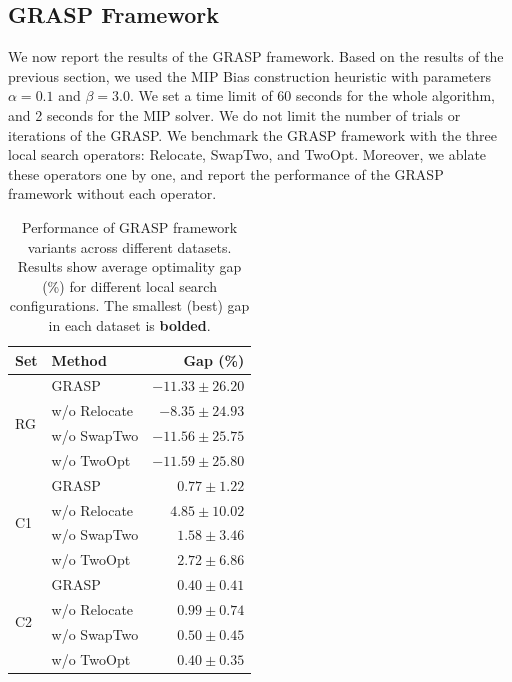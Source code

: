 \documentclass[twocolumn, switch]{article} %
\begin{document}
\subsection{GRASP Framework}

We now report the results of the GRASP framework. 
Based on the results of the previous section, we used the MIP Bias construction heuristic with parameters $\alpha = 0.1$ and $\beta = 3.0$.
We set a time limit of 60 seconds for the whole algorithm, and 2 seconds for the MIP solver.
We do not limit the number of trials or iterations of the GRASP. We benchmark the GRASP framework with the three local search operators: Relocate, SwapTwo, and TwoOpt.
Moreover, we ablate these operators one by one, and report the performance of the GRASP framework without each operator.


\begin{table}[h]
    \caption{Performance of GRASP framework variants across different datasets. Results show average optimality gap (\%) for different local search configurations. The smallest (best) gap in each dataset is \textbf{bolded}.}
    \label{tab:grasp_performance}
    \centering
    \begin{tabular}{llr}
        \toprule
        \textbf{Set} & \textbf{Method} & \textbf{Gap (\%)} \\
        \midrule
        \multirow[c]{4}{*}{RG} 
            & GRASP & $-11.33 \pm 26.20$ \\
            & w/o Relocate & $-8.35 \pm 24.93$ \\
            & w/o SwapTwo & $-11.56 \pm 25.75$ \\
            & w/o TwoOpt & $\mathbf{-11.59 \pm 25.80}$ \\
        \midrule
        \multirow[c]{4}{*}{C1} 
            & GRASP & $\mathbf{0.77 \pm 1.22}$ \\
            & w/o Relocate & $4.85 \pm 10.02$ \\
            & w/o SwapTwo & $1.58 \pm 3.46$ \\
            & w/o TwoOpt & $2.72 \pm 6.86$ \\
        \midrule
        \multirow[c]{4}{*}{C2} 
            & GRASP & $\mathbf{0.40 \pm 0.41}$ \\
            & w/o Relocate & $0.99 \pm 0.74$ \\
            & w/o SwapTwo & $0.50 \pm 0.45$ \\
            & w/o TwoOpt & $\mathbf{0.40 \pm 0.35}$ \\
        \bottomrule
    \end{tabular}
\end{table}
\end{document}
